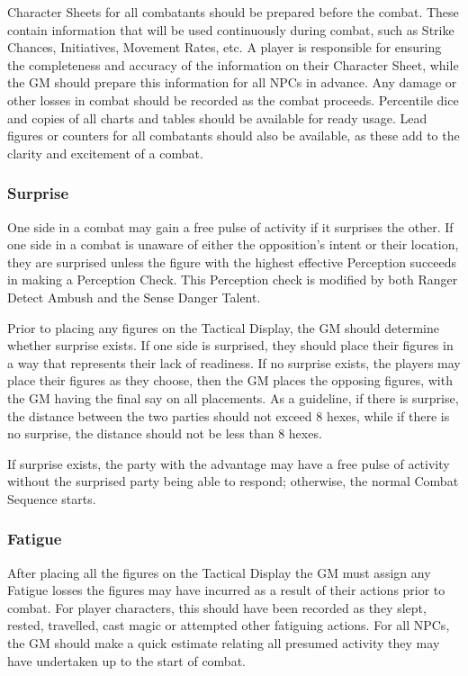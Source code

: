 \begin{multicols*}{3}
Character Sheets for all combatants should be prepared before the
combat. These contain information that will be used continuously
during combat, such as Strike Chances, Initiatives, Movement Rates,
etc. A player is responsible for ensuring the completeness and
accuracy of the information on their Character Sheet, while the GM
should prepare this information for all NPCs in advance. Any damage or
other losses in combat should be recorded as the combat
proceeds. Percentile dice and copies of all charts and tables should
be available for ready usage. Lead figures or counters for all
combatants should also be available, as these add to the clarity and
excitement of a combat.

\subsubsection{Surprise}

One side in a combat may gain a free pulse of activity if it surprises
the other. If one side in a combat is unaware of either the
opposition's intent or their location, they are surprised unless the
figure with the highest effective Perception succeeds in making a
Perception Check. This Perception check is modified by both Ranger
Detect Ambush and the Sense Danger Talent.

Prior to placing any figures on the Tactical Display, the GM should
determine whether surprise exists. If one side is surprised, they
should place their figures in a way that represents their lack of
readiness. If no surprise exists, the players may place their figures
as they choose, then the GM places the opposing figures, with the GM
having the final say on all placements. As a guideline, if there is
surprise, the distance between the two parties should not exceed 8
hexes, while if there is no surprise, the distance should not be less
than 8 hexes.

If surprise exists, the party with the advantage may have a free pulse
of activity without the surprised party being able to respond;
otherwise, the normal Combat Sequence starts.

\subsubsection{Fatigue}

After placing all the figures on the Tactical Display the GM must
assign any Fatigue losses the figures may have incurred as a result of
their actions prior to combat. For player characters, this should have
been recorded as they slept, rested, travelled, cast magic or
attempted other fatiguing actions. For all NPCs, the GM should make a
quick estimate relating all presumed activity they may have undertaken
up to the start of combat.


\end{multicols*}
